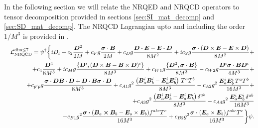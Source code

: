 In the following section we will relate the NRQED and NRQCD operators to tensor decomposition provided in sections \ref{sec:SI_mat_decomp} and \ref{sec:SD_mat_decomp}. The NRQCD Lagrangian upto and including the order $1/M^3$ is provided in \cite{Manohar:1997qy}.
\begin{eqnarray}\label{eqn:NRQCD_Lag_dim_7}
&&{\cal L}_{\mbox{\scriptsize NRQCD}}^{\mbox{\scriptsize dim$\leq$7}} = \psi^\dagger
  \bigg\{  i D_t  + c_2{\bm{D}^2 \over 2 M}+ 
  c_F g{ \bm{\sigma}\cdot \bm{B} \over 2M}   
+ c_D g{\bm{D\cdot E}-\bm{E\cdot D} \over 8 M^2}  + i c_S g{ \bm{\sigma}
    \cdot ( \bm{D} \times \bm{E} - \bm{E}\times \bm{D} ) \over 8 M^2}+  \nonumber\\
    &&+ c_4{\bm{D}^4 \over 8 M^3} + i c_M g { \{ \bm{D}^i , ( \bm{D} \times \bm{B} - \bm{B}\times \bm{D} )^i \}\over 8 M^3}   + c_{W1}g {  \{ \bm{D}^2 ,  \bm{\sigma}\cdot \bm{B} \}  \over 8 M^3} - c_{W2}g {  \bm{D}^i \bm{\sigma}\cdot
    \bm{B} \bm{D}^i \over 4 M^3 }+ \nonumber\\
    && + c_{p^\prime p} g { \bm{\sigma} \cdot
    \bm{D} \bm{B}\cdot \bm{D} + \bm{D}\cdot\bm{B} \bm{\sigma}\cdot \bm{D}
    \over  8 M^3} +   c_{A1} g^2\,{ \left(\bm{B}_a^i\bm{B}_b^i - \bm{E}_a^i\bm{E}_b^i\right)\,T^aT^b \over 8 M^3} - c_{A2} g^2\,{\bm{E}_a^i\bm{E}_b^i\,T^aT^b
    \over 16 M^3 }+    \nonumber\\ 
    &&+  c_{A3} g^2\,{ \left(\bm{B}_a^i\bm{B}_b^i - \bm{E}_a^i\bm{E}_b^i\right)\delta^{ab} \over 8 M^3} - c_{A4} g^2\,{\bm{E}_a^i\bm{E}_b^i\,\delta^{ab}
    \over 16 M^3 }\nonumber\\
  &&
     -c_{B1} g^2 {\bm{\sigma\cdot} (\bm{B}_a\bm{\times B}_b - \bm{E}_a\times\bm{E}_b)f^{abc}T^c \over 16 M^3}+ c_{B2} g^2 {\bm{\sigma\cdot} (\bm{E}_a\times\bm{E}_b)f^{abc}T^c \over 16 M^3}
       \bigg\} \psi.
   \end{eqnarray}

